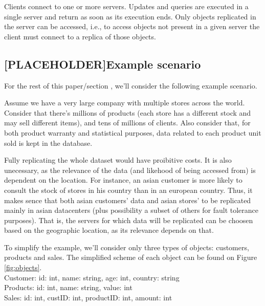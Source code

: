\documentclass{vldb}
\begin{document}

Clients connect to one or more servers. Updates and queries are executed in a single server and return as soon as its execution ends. Only objects replicated in the server can be accessed, i.e., to access objects not present in a given server the client must connect to a replica of those objects.

\subsection{[PLACEHOLDER]Example scenario}
\label{subsec:example}

For the rest of this paper/section %
, we'll consider the following example scenario.

Assume we have a very large company with multiple stores across the world.
Consider that there's millions of products (each store has a different stock and may sell different items), and tens of millions of clients.
Also consider that, for both product warranty and statistical purposes, data related to each product unit sold is kept in the database.

Fully replicating the whole dataset would have proibitive costs.
It is also unecessary, as the relevance of the data (and likehood of being accessed from) is dependent on the location.
For instance, an asian customer is more likely to consult the stock of stores in his country than in an european country.
Thus, it makes sence that both asian customers' data and asian stores' to be replicated mainly in asian datacenters (plus possibility a subset of others for fault tolerance purposes).
That is, the servers for which data will be replicated can be choosen based on the geographic location, as its relevance depends on that.

To simplify the example, we'll consider only three types of objects: customers, products and sales.
The simplified scheme of each object can be found on Figure \ref{fig:objects}.\\

Customer: id: int, name: string, age: int, country: string \\
Products: id: int, name: string, value: int \\
Sales: id: int, custID: int, productID: int, amount: int \\
\end{document}
